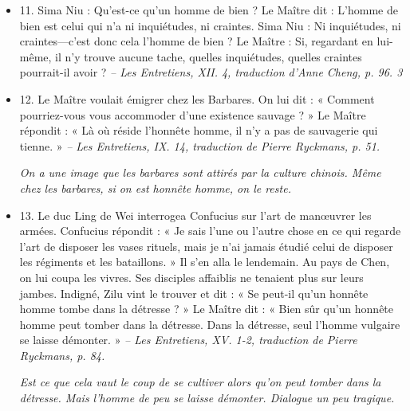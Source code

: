 \begin{itemize}
\item 11. \newline  Sima Niu : Qu’est-ce qu’un homme de bien ? \newline Le Maître dit : L’homme de bien est celui qui n’a ni inquiétudes, ni craintes. Sima Niu : Ni inquiétudes, ni craintes—c’est donc cela l’homme de bien ? \newline Le Maître : Si, regardant en lui-même, il n’y trouve aucune tache, quelles inquiétudes, quelles craintes pourrait-il avoir ? \textit{\small -- Les Entretiens, XII. 4, traduction d’Anne Cheng, p. 96.   3 }
\item 12. \newline Le Maître voulait émigrer chez les Barbares. On lui dit : « Comment pourriez-vous vous accommoder d’une existence sauvage ? » \newline Le Maître répondit : « Là où réside l’honnête homme, il n’y a pas de sauvagerie qui tienne. » \textit{\small -- Les Entretiens, IX. 14, traduction de Pierre Ryckmans, p. 51.  }

\textit{ 
    On a une image que les barbares sont attirés par la culture chinois. Même chez les barbares, si on est honnête homme, on le reste. }
 


\item 13. \newline Le duc Ling de Wei interrogea Confucius sur l’art de manœuvrer les armées. Confucius répondit : \newline « Je sais l’une ou l’autre chose en ce qui regarde l’art de disposer les vases rituels, mais je n’ai jamais étudié celui de disposer les régiments et les bataillons. » \newline Il s’en alla le lendemain.          Au pays de Chen, on lui coupa les vivres. Ses disciples affaiblis ne tenaient plus sur leurs jambes. Indigné, Zilu vint le trouver et dit : \newline « Se peut-il qu’un honnête homme tombe dans la détresse ? » \newline Le Maître dit : « Bien sûr qu’un honnête homme peut tomber dans la détresse. Dans la détresse, seul l’homme vulgaire se laisse démonter. »  \textit{\small -- Les Entretiens, XV. 1-2, traduction de Pierre Ryckmans, p. 84.  }

 
 \textit{   Est ce que cela vaut le coup de se cultiver alors qu'on peut tomber dans la détresse. Mais l'homme de peu se laisse démonter.
    Dialogue un peu tragique. }
 
\end{itemize}
